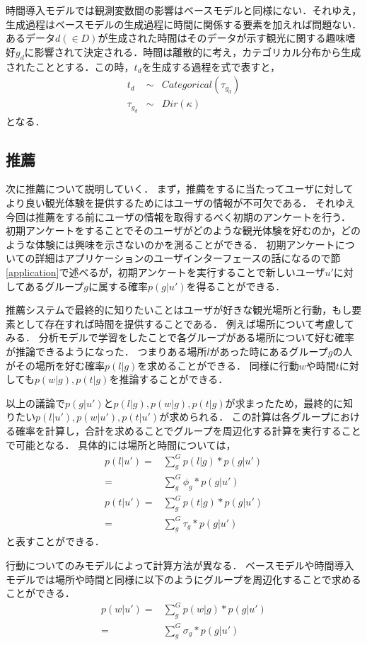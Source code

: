 \documentclass[a4j,10pt, twocolumn]{jarticle}
\begin{document}
時間導入モデルでは観測変数間の影響はベースモデルと同様にない．それゆえ，生成過程はベースモデルの生成過程に時間に関係する要素を加えれば問題ない．
あるデータ$d(\in D)$が生成された時間はそのデータが示す観光に関する趣味嗜好$g_d$に影響されて決定される．時間は離散的に考え，カテゴリカル分布から生成されたこととする．この時，$t_d$を生成する過程を式で表すと，
\begin{eqnarray*}
  t_d & \sim & Categorical(\tau_{g_d}) \\
  \tau_{g_d} & \sim & Dir(\kappa)
\end{eqnarray*}
となる．

\subsection{推薦} \label{recommendation}
次に推薦について説明していく．
まず，推薦をするに当たってユーザに対してより良い観光体験を提供するためにはユーザの情報が不可欠である．
それゆえ今回は推薦をする前にユーザの情報を取得するべく初期のアンケートを行う．
初期アンケートをすることでそのユーザがどのような観光体験を好むのか，どのような体験には興味を示さないのかを測ることができる．
初期アンケートについての詳細はアプリケーションのユーザインターフェースの話になるので節\ref{application}で述べるが，初期アンケートを実行することで新しいユーザ$u'$に対してあるグループ$g$に属する確率$p(g|u')$を得ることができる．

推薦システムで最終的に知りたいことはユーザが好きな観光場所と行動，もし要素として存在すれば時間を提供することである．
例えば場所について考慮してみる．
分析モデルで学習をしたことで各グループがある場所について好む確率が推論できるようになった．
つまりある場所$l$があった時にあるグループ$g$の人がその場所を好む確率$p(l|g)$を求めることができる．
同様に行動$w$や時間$t$に対しても$p(w|g), p(t|g)$を推論することができる．

以上の議論で$p(g|u')$と$p(l|g), p(w|g), p(t|g)$が求まったため，最終的に知りたい$p(l|u'), p(w|u'), p(t|u')$が求められる．
この計算は各グループにおける確率を計算し，合計を求めることでグループを周辺化する計算を実行することで可能となる．
具体的には場所と時間については，
\begin{eqnarray*}
p(l|u') =& \sum_g^G p(l|g) * p(g|u') \\
=& \sum_g^G \phi_g * p(g|u') \\
p(t|u') =& \sum_g^G p(t|g) * p(g|u') \\
=& \sum_g^G \tau_g * p(g|u')
\end{eqnarray*}
と表すことができる．

行動についてのみモデルによって計算方法が異なる．
ベースモデルや時間導入モデルでは場所や時間と同様に以下のようにグループを周辺化することで求めることができる．
\begin{eqnarray*}
  p(w|u') =& \sum_g^G p(w|g) * p(g|u') \\
  =& \sum_g^G \sigma_g * p(g|u')
\end{eqnarray*}
\end{document}

